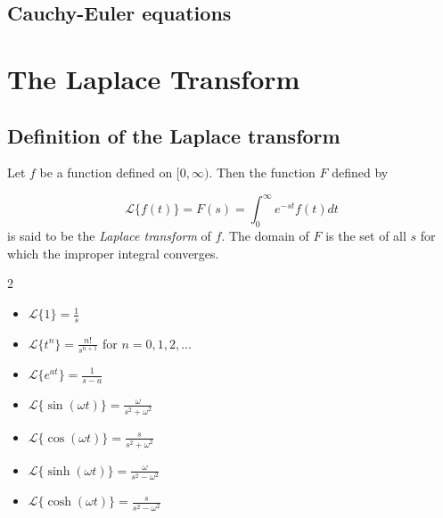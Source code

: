 \documentclass{article}
\begin{document}
\subsection{Cauchy-Euler equations}

\section{The Laplace Transform}

\subsection{Definition of the Laplace transform}

\begin{defn} 
    Let \(f\) be a function defined on \([0,\infty)\). Then the function \(F\) defined by

    \begin{equation}
        \mathcal{L} \{f(t)\} = F(s) = \int_0^\infty e^{-st} f(t) dt
    \end{equation}
    is said to be the \emph{Laplace transform} of \(f\). The domain of \(F\) is the set of all \(s\) for which the improper integral converges.

\end{defn}

\begin{thm} 
    \begin{multicols}{2}
    \begin{itemize}
        \item [(a)] \(\displaystyle\mathcal{L} \{1\} = \frac{1}{s}\)
        \item [(b)] \(\displaystyle\mathcal{L} \{t^n\} = \frac{n!}{s^{n+1}}\) for \(n = 0, 1, 2, \ldots\)
        \item [(c)] \(\displaystyle\mathcal{L} \{e^{at}\} = \frac{1}{s-a}\)
        \item [(d)] \(\displaystyle\mathcal{L} \{\sin(\omega t)\} = \frac{\omega}{s^2 + \omega^2}\)
        \item [(e)] \(\displaystyle\mathcal{L} \{\cos(\omega t)\} = \frac{s}{s^2 + \omega^2}\)
        \item [(f)] \(\displaystyle\mathcal{L} \{\sinh(\omega t)\} = \frac{\omega}{s^2 - \omega^2}\)
        \item [(g)] \(\displaystyle\mathcal{L} \{\cosh(\omega t)\} = \frac{s}{s^2 - \omega^2}\)
    \end{itemize}
    \end{multicols}    
\end{thm}
\end{document}
